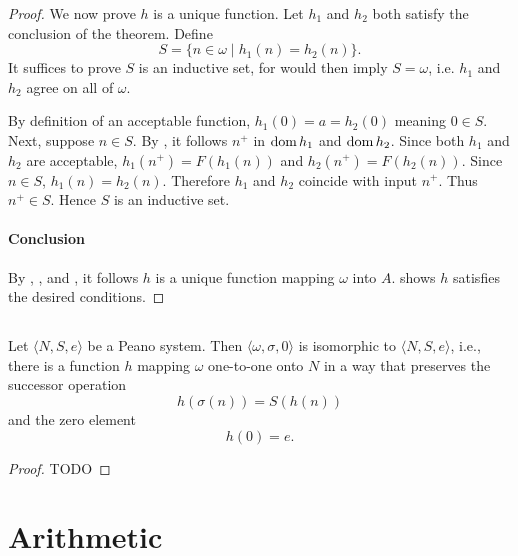 \documentclass{report}
\begin{document}
\begin{proof}
      We now prove $h$ is a unique function.
      Let $h_1$ and $h_2$ both satisfy the conclusion of the theorem.
      Define $$S = \{n \in \omega \mid h_1(n) = h_2(n)\}.$$
      It suffices to prove $S$ is an inductive set, for 
        would then imply $S = \omega$, i.e. $h_1$ and $h_2$ agree on all of
        $\omega$.

      By definition of an acceptable function, $h_1(0) = a = h_2(0)$ meaning
        $0 \in S$.
      Next, suppose $n \in S$.
      By , it follows $n^+$
        in $\mathop{\text{dom}}{h_1}$ and $\mathop{\text{dom}}{h_2}$.
      Since both $h_1$ and $h_2$ are acceptable, $h_1(n^+) = F(h_1(n))$ and
        $h_2(n^+) = F(h_2(n))$.
      Since $n \in S$, $h_1(n) = h_2(n)$.
      Therefore $h_1$ and $h_2$ coincide with input $n^+$.
      Thus $n^+ \in S$.
      Hence $S$ is an inductive set.

    \paragraph{Conclusion}%

      By ,
        , and
        , it follows $h$ is a
        unique function mapping $\omega$ into $A$.
       shows $h$ satisfies the
        desired conditions.

  \end{proof}

\subsection{}%

  \begin{theorem}[4H]
    Let $\langle N, S, e \rangle$ be a Peano system.
    Then $\langle \omega, \sigma, 0 \rangle$ is isomorphic to
      $\langle N, S, e \rangle$, i.e., there is a function $h$ mapping $\omega$
      one-to-one onto $N$ in a way that preserves the successor operation
      $$h(\sigma(n)) = S(h(n))$$ and the zero element $$h(0) = e.$$
  \end{theorem}

  \begin{proof}
    TODO
  \end{proof}

\section{Arithmetic}%
\end{document}
